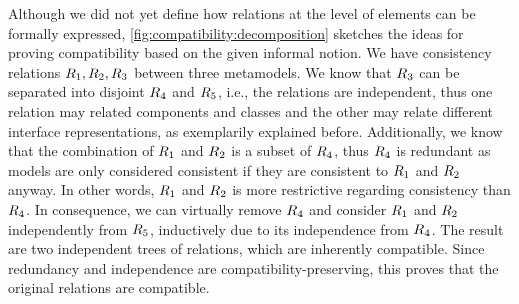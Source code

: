 Although we did not yet define how relations at the level of elements can be formally expressed, \autoref{fig:compatibility:decomposition} sketches the ideas for proving compatibility based on the given informal notion.
We have consistency relations $R_{1}, R_{2}, R_{3}$ between three metamodels.
We know that $R_{3}$ can be separated into disjoint $R_{4}$ and $R_{5}$, i.e., the relations are independent, thus one relation may related components and classes and the other may relate different interface representations, as exemplarily explained before.
Additionally, we know that the combination of $R_{1}$ and $R_{2}$ is a subset of $R_{4}$, thus $R_{4}$ is redundant as models are only considered consistent if they are consistent to $R_{1}$ and $R_{2}$ anyway.
In other words, $R_{1}$ and $R_{2}$ is more restrictive regarding consistency than $R_{4}$.
In consequence, we can virtually remove $R_{4}$ and consider $R_{1}$ and $R_{2}$ independently from $R_{5}$, inductively due to its independence from $R_{4}$.
The result are two independent trees of relations, which are inherently compatible.
Since redundancy and independence are compatibility-preserving, this proves that the original relations are compatible.



